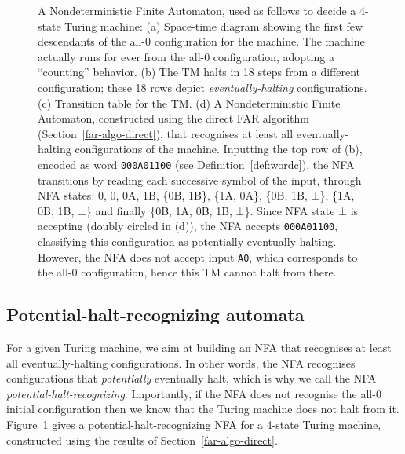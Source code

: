 \begin{figure}
  \caption{\small A Nondeterministic Finite Automaton, used as follows to decide a 4-state Turing machine\protect\footnotemark:
    (a) Space-time diagram showing the first few descendants of the all-0 configuration for the machine. The machine actually runs for ever from the all-0 configuration, adopting a ``counting'' behavior.
    (b) The TM halts in 18 steps from a different configuration; these 18 rows depict \emph{eventually-halting} configurations.
    (c) Transition table for the TM.
    (d) A Nondeterministic Finite Automaton, constructed using the direct FAR algorithm (Section~\ref{far-algo-direct}), that recognises at least all eventually-halting configurations of the machine. Inputting the top row of (b), encoded as word \texttt{000A01100} (see Definition~\ref{def:wordc}), the NFA transitions by reading each successive symbol of the input, through NFA states: 0, 0, 0A, 1B, \{0B, 1B\}, \{1A, 0A\}, \{0B, 1B, $\bot$\}, \{1A, 0B, 1B, $\bot$\} and finally \{0B, 1A, 0B, 1B, $\bot$\}. Since NFA state $\bot$ is accepting (doubly circled in (d)), the NFA accepts \texttt{000A01100}, classifying this configuration as potentially eventually-halting. However, the NFA does not accept input \texttt{A0}, which corresponds to the all-0 configuration, hence this TM cannot halt from there.}



  \label{fig:finite-automata-reduction}
\end{figure}


\subsection{Potential-halt-recognizing automata}
\newcommand{\M}{\mathcal{M}}
\newcommand{\T}{^T}
\newcommand{\row}{\text{row}}
\label{far-defs-recognizer}
For a given Turing machine, we aim at building an NFA that recognises at least all eventually-halting configurations. In other words, the NFA recognises configurations that \textit{potentially} eventually halt, which is why we call the NFA \textit{potential-halt-recognizing}. Importantly, if the NFA does not recognise the all-0 initial configuration then we know that the Turing machine does not halt from it. Figure~\ref{fig:finite-automata-reduction} gives a potential-halt-recognizing NFA for a 4-state Turing machine, constructed using the results of Section~\ref{far-algo-direct}.


